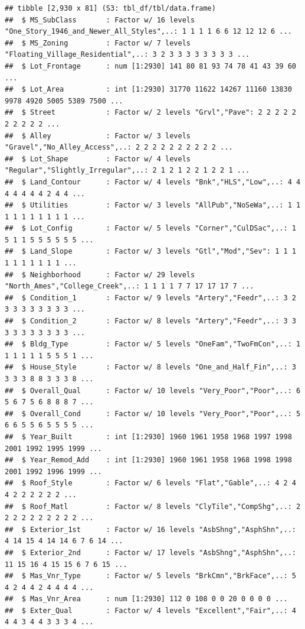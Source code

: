 \documentclass[
]{book}
\theoremstyle{definition}
\theoremstyle{definition}
\theoremstyle{definition}
\theoremstyle{definition}
\theoremstyle{remark}
\begin{document}
\begin{verbatim}
## tibble [2,930 x 81] (S3: tbl_df/tbl/data.frame)
##  $ MS_SubClass       : Factor w/ 16 levels "One_Story_1946_and_Newer_All_Styles",..: 1 1 1 1 6 6 12 12 12 6 ...
##  $ MS_Zoning         : Factor w/ 7 levels "Floating_Village_Residential",..: 3 2 3 3 3 3 3 3 3 3 ...
##  $ Lot_Frontage      : num [1:2930] 141 80 81 93 74 78 41 43 39 60 ...
##  $ Lot_Area          : int [1:2930] 31770 11622 14267 11160 13830 9978 4920 5005 5389 7500 ...
##  $ Street            : Factor w/ 2 levels "Grvl","Pave": 2 2 2 2 2 2 2 2 2 2 ...
##  $ Alley             : Factor w/ 3 levels "Gravel","No_Alley_Access",..: 2 2 2 2 2 2 2 2 2 2 ...
##  $ Lot_Shape         : Factor w/ 4 levels "Regular","Slightly_Irregular",..: 2 1 2 1 2 2 1 2 2 1 ...
##  $ Land_Contour      : Factor w/ 4 levels "Bnk","HLS","Low",..: 4 4 4 4 4 4 4 2 4 4 ...
##  $ Utilities         : Factor w/ 3 levels "AllPub","NoSeWa",..: 1 1 1 1 1 1 1 1 1 1 ...
##  $ Lot_Config        : Factor w/ 5 levels "Corner","CulDSac",..: 1 5 1 1 5 5 5 5 5 5 ...
##  $ Land_Slope        : Factor w/ 3 levels "Gtl","Mod","Sev": 1 1 1 1 1 1 1 1 1 1 ...
##  $ Neighborhood      : Factor w/ 29 levels "North_Ames","College_Creek",..: 1 1 1 1 7 7 17 17 17 7 ...
##  $ Condition_1       : Factor w/ 9 levels "Artery","Feedr",..: 3 2 3 3 3 3 3 3 3 3 ...
##  $ Condition_2       : Factor w/ 8 levels "Artery","Feedr",..: 3 3 3 3 3 3 3 3 3 3 ...
##  $ Bldg_Type         : Factor w/ 5 levels "OneFam","TwoFmCon",..: 1 1 1 1 1 1 5 5 5 1 ...
##  $ House_Style       : Factor w/ 8 levels "One_and_Half_Fin",..: 3 3 3 3 8 8 3 3 3 8 ...
##  $ Overall_Qual      : Factor w/ 10 levels "Very_Poor","Poor",..: 6 5 6 7 5 6 8 8 8 7 ...
##  $ Overall_Cond      : Factor w/ 10 levels "Very_Poor","Poor",..: 5 6 6 5 5 6 5 5 5 5 ...
##  $ Year_Built        : int [1:2930] 1960 1961 1958 1968 1997 1998 2001 1992 1995 1999 ...
##  $ Year_Remod_Add    : int [1:2930] 1960 1961 1958 1968 1998 1998 2001 1992 1996 1999 ...
##  $ Roof_Style        : Factor w/ 6 levels "Flat","Gable",..: 4 2 4 4 2 2 2 2 2 2 ...
##  $ Roof_Matl         : Factor w/ 8 levels "ClyTile","CompShg",..: 2 2 2 2 2 2 2 2 2 2 ...
##  $ Exterior_1st      : Factor w/ 16 levels "AsbShng","AsphShn",..: 4 14 15 4 14 14 6 7 6 14 ...
##  $ Exterior_2nd      : Factor w/ 17 levels "AsbShng","AsphShn",..: 11 15 16 4 15 15 6 7 6 15 ...
##  $ Mas_Vnr_Type      : Factor w/ 5 levels "BrkCmn","BrkFace",..: 5 4 2 4 4 2 4 4 4 4 ...
##  $ Mas_Vnr_Area      : num [1:2930] 112 0 108 0 0 20 0 0 0 0 ...
##  $ Exter_Qual        : Factor w/ 4 levels "Excellent","Fair",..: 4 4 4 3 4 4 3 3 3 4 ...

\end{verbatim}
\end{document}
